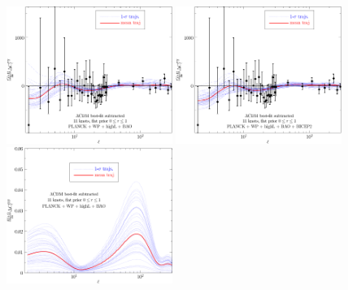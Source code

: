 \documentclass[11pt]{article}
\def \halffigwidth{0.48\textwidth}
\begin{document}
\begin{figure}
\includegraphics[width = \halffigwidth]{nobicep_spline0_p11_dclTT_trajs.pdf}%
\includegraphics[width = \halffigwidth]{spline0_p11_dclTT_trajs.pdf}
\includegraphics[width = \halffigwidth]{nobicep_spline0_p11_dclBB_trajs.pdf}%

\end{figure}
\end{document}
